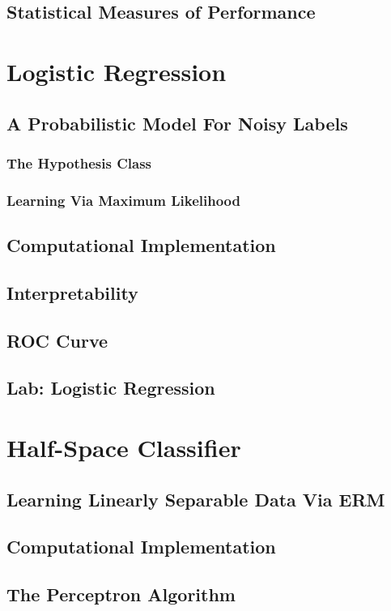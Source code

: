 \documentclass[11pt,fleqn]{book} %
\begin{document}
        \subsection{Statistical Measures of Performance}
        
    \section{Logistic Regression}
        \subsection{A Probabilistic Model For Noisy Labels}
            \subsubsection{The Hypothesis Class}
            \subsubsection{Learning Via Maximum Likelihood}
        \subsection{Computational Implementation}
        \subsection{Interpretability}
        \subsection{ROC Curve}
        \subsection{Lab: Logistic Regression}
    
    \section{Half-Space Classifier}
        \subsection{Learning Linearly Separable Data Via ERM}
        \subsection{Computational Implementation}
        \subsection{The Perceptron Algorithm}
        
\end{document}
